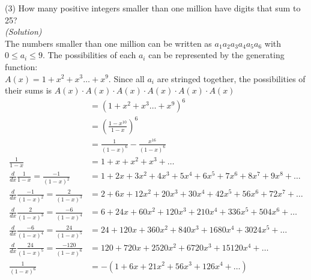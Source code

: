 (3) How many positive integers smaller than one million 
    have digits that sum to 25?\\

    \textit{(Solution)}\\

    The numbers smaller than one million can be written as
    $a_1a_2a_3a_4a_5a_6$ with $0 \le a_i \le 9$. The possibilities
    of each $a_i$ can be represented by the generating function:\\

    $A(x) = 1+x^2+x^3\dots+x^9$. Since all $a_i$ are stringed together,
    the possibilities of their sums is $A(x)\cdot A(x)\cdot A(x)\cdot A(x)\cdot A(x)\cdot A(x)$
    \begin{align*}
        &= (1+x^2+x^3\dots+x^9)^6\\
        &= (\frac{1-x^{10}}{1-x})^6\\
        &= \frac{1}{(1-x)^6} - \frac{x^{16}}{(1-x)^6}\\
        \frac{1}{1-x} &= 1+x+x^2+x^3+\dots\\
        \frac{d}{dx}\frac{1}{1-x} = \frac{-1}{(1-x)^2}
        &= 1+2x+3x^2+4x^3+5x^4+6x^5+7x^6+8x^7+9x^8+\dots\\
        \frac{d}{dx}\frac{-1}{(1-x)^2} = \frac{2}{(1-x)^3}
        &= 2+6x+12x^2+20x^3+30x^4+42x^5+56x^6+72x^7+\dots\\
        \frac{d}{dx}\frac{2}{(1-x)^3} = \frac{-6}{(1-x)^4}
        &= 6+24x+60x^2+120x^3+210x^4+336x^5+504x^6+\dots\\
        \frac{d}{dx}\frac{-6}{(1-x)^4} = \frac{24}{(1-x)^5}
        &= 24+120x+360x^2+840x^3+1680x^4+3024x^5+\dots\\
        \frac{d}{dx}\frac{24}{(1-x)^5} = \frac{-120}{(1-x)^6}
        &= 120+720x+2520x^2+6720x^3+15120x^4+\dots\\
        \frac{1}{(1-x)^6}
        &= -(1+6x+21x^2+56x^3+126x^4+\dots)\\
    \end{align*}

